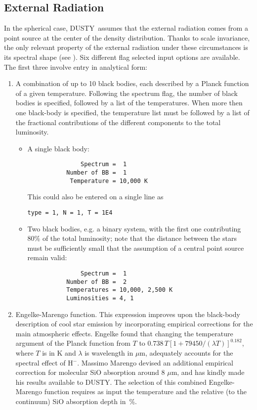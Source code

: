\documentclass[12pt]{article} \usepackage{epsf}
\def\D  {{\sf DUSTY}}
\def\mic    {\hbox{$\mu$m}}
\begin{document}
\subsection
                        {External Radiation}
\label{source}

In the spherical case, \D\ assumes that the external radiation comes from a
point source at the center of the density distribution. Thanks to scale
invariance, the only relevant property of the external radiation under these
circumstances is its spectral shape (see \cite{IE97}).  Six different flag
selected input options are available. The first three involve entry in
analytical form:

\begin{enumerate}

\item

A combination of up to 10 black bodies, each described by a Planck function of
a given temperature. Following the spectrum flag, the number of black bodies is
specified, followed by a list of the temperatures.  When more then one
black-body is specified, the temperature list must be followed by a list of the
fractional contributions of the different components to the total luminosity.

\begin{itemize}
\item A single black body:
\begin{verbatim}
               Spectrum =  1
           Number of BB =  1
            Temperature = 10,000 K
 \end{verbatim}

This could also be entered on a single line as

\hskip 1in {\tt type = 1, N = 1, T = 1E4}

\item Two black bodies, e.g. a binary system, with the first one contributing
80\% of the total luminosity; note that the distance between the stars must be
sufficiently small that the assumption of a central point source remain valid:
\begin{verbatim}
               Spectrum =  1
           Number of BB =  2
           Temperatures = 10,000, 2,500 K
           Luminosities = 4, 1
\end{verbatim}

\end{itemize}

\item
Engelke-Marengo function.  This expression improves upon the black-body
description of cool star emission by incorporating empirical corrections for
the main atmospheric effects. Engelke \cite{Engelk} found that changing the
temperature argument of the Planck function from $T$ to $0.738\,T[1 +
79450/(\lambda T)]^{0.182}$, where $T$ is in K and $\lambda$ is wavelength in
\mic, adequately accounts for the spectral effect of H$^-$. Massimo Marengo
\cite{Mareng} devised an additional empirical correction for molecular SiO
absorption around 8 \mic, and has kindly made his results available to DUSTY.
The selection of this combined Engelke-Marengo function requires as input the
temperature and the relative (to the continuum) SiO absorption depth in~\%.


\end{enumerate}
\end{document}
